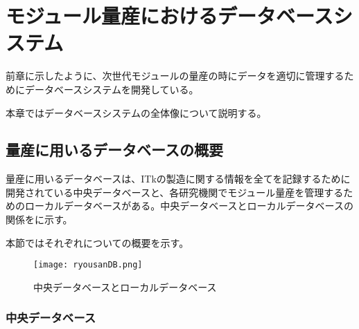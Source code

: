 \chapter{モジュール量産におけるデータベースシステム}
\label{sec:}

前章に示したように、次世代モジュールの量産の時にデータを適切に管理するためにデータベースシステムを開発している。

本章ではデータベースシステムの全体像について説明する。


\section{量産に用いるデータベースの概要}
\label{sec:DBforMasspro}

量産に用いるデータベースは、ITkの製造に関する情報を全てを記録するために開発されている中央データベースと、各研究機関でモジュール量産を管理するためのローカルデータベースがある。中央データベースとローカルデータベースの関係をに示す。

本節ではそれぞれについての概要を示す。
\begin{figure}[tbp]
  \centering
  \texttt{[image: ryousanDB.png]}
  \caption[中央データベースとローカルデータベース]{中央データベースとローカルデータベース}
  \label{fig:ryousanDB}
\end{figure}

\subsection{中央データベース}
\label{sec:ITkPD}

